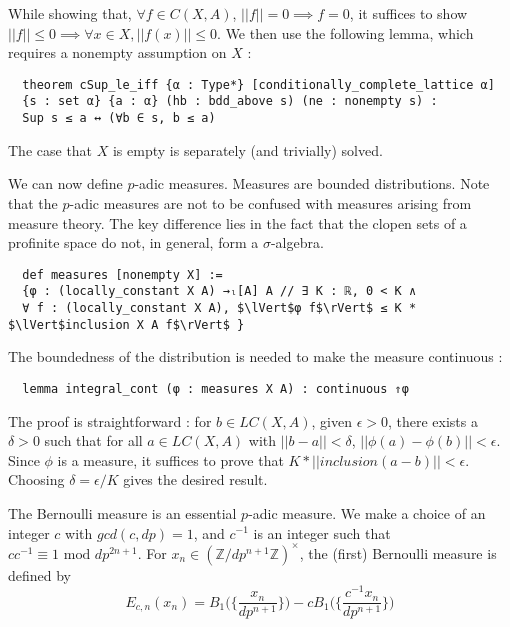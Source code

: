 \documentclass[a4paper,UKenglish,cleveref, autoref, thm-restate]{lipics-v2021}
\newcommand{\lean}[1]{\texttt{#1}\xspace} %
\begin{document}
While showing that, $\forall f \in C(X, A)$, $||f|| = 0 \implies f = 0$, it suffices to show 
$||f|| \le 0 \implies \forall x \in X, ||f(x)|| \le 0$. We then use the following lemma, which 
requires a nonempty assumption on $X$ :
\begin{lstlisting}
  theorem cSup_le_iff {α : Type*} [conditionally_complete_lattice α] 
  {s : set α} {a : α} (hb : bdd_above s) (ne : nonempty s) : 
  Sup s ≤ a ↔ (∀b ∈ s, b ≤ a)
\end{lstlisting}

The case that $X$ is empty is separately (and trivially) solved. 

We can now define $p$-adic measures. Measures are bounded distributions. Note that the $p$-adic measures
are not to be confused with measures arising from measure theory. The key difference lies in the
fact that the clopen sets of a profinite space do not, in general, form a $\sigma$-algebra. 

\begin{lstlisting}
  def measures [nonempty X] :=
  {φ : (locally_constant X A) →ₗ[A] A // ∃ K : ℝ, 0 < K ∧ 
  ∀ f : (locally_constant X A), $\lVert$φ f$\rVert$ ≤ K * $\lVert$inclusion X A f$\rVert$ }
\end{lstlisting}

The boundedness of the distribution is needed to make the measure continuous :
\begin{lstlisting}
  lemma integral_cont (φ : measures X A) : continuous ⇑φ
\end{lstlisting}

The proof is straightforward : for $b \in LC(X, A)$, given $\epsilon > 0$, there exists a
$\delta > 0$ such that for all $a \in LC(X, A)$ with $|| b - a || < \delta$,
$|| \phi(a) - \phi(b) || < \epsilon$. Since $\phi$ is a measure, it suffices to prove that
$ K * ||inclusion (a - b)|| < \epsilon $. Choosing $\delta  = \epsilon / K$ gives the desired
result. 

The Bernoulli measure is an essential $p$-adic measure. We make a choice of an integer $c$ with
$gcd(c,dp) = 1$, and $c^{-1}$ is an integer such that $c c^{-1} \equiv 1 \text{ mod } dp^{2n+1}$.
For $x_n \in (\mathbb{Z} / dp^{n +1} \mathbb{Z})^{\times}$, the (first) Bernoulli measure is defined by
$$ E_{c,n}(x_n) = B_1 \bigg( \bigg\{ \frac{x_n}{dp^{n + 1}} \bigg\} \bigg) -
  cB_1 \bigg( \bigg\{ \frac{c^{-1}x_n}{dp^{n + 1}} \bigg\} \bigg) $$
\end{document}
